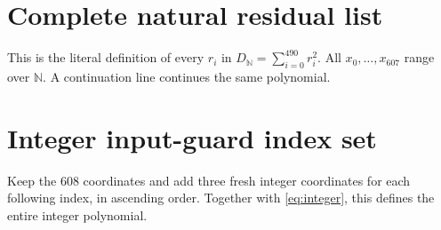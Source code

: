 \documentclass[11pt,letterpaper]{article}
\newcommand{\N}{\mathbb N}
\theoremstyle{definition}\newtheorem{definition}[theorem]{Definition}
\theoremstyle{remark}\newtheorem{remark}[theorem]{Remark}
\begin{document}
\appendix
\section{Complete natural residual list}\label{app:literal}

This is the literal definition of every $r_i$ in
$D_{\N}=\sum_{i=0}^{490}r_i^2$. All $x_0,\ldots,x_{607}$ range over
$\N$. A continuation line continues the same polynomial.
\begingroup
\footnotesize
\setlength{\jot}{2pt}

\endgroup

\clearpage
\section{Integer input-guard index set}\label{app:integer}

Keep the 608 coordinates and add three fresh integer coordinates for
each following index, in ascending order. Together with
\eqref{eq:integer}, this defines the entire integer polynomial.

\end{document}
